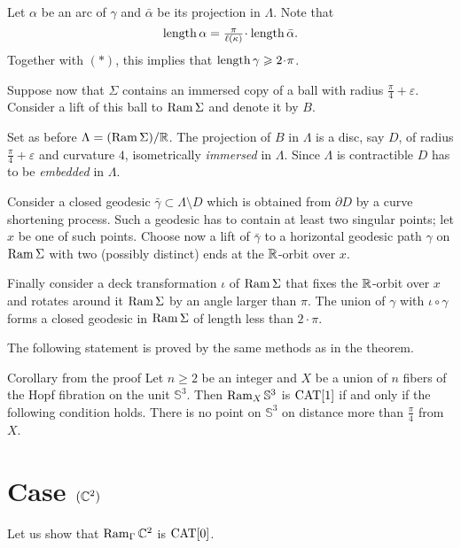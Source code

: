 \documentclass[oneside,a4paper]{article}
\def\Ram{\mathop{\rm Ram}\nolimits}
\def\SS{\mathbb{S}}
\begin{document}
Let $\alpha$ be an arc of $\gamma$
and $\bar\alpha$ be its projection in $\Lambda$.
Note that
$$\length \alpha
=
\tfrac{\pi}{\ell(\kappa)}\cdot\length \bar\alpha.
$$
Together with $({*})$,
this implies that $\length\gamma\ge 2{\cdot}\pi$.

Suppose now that $\Sigma$ contains an immersed copy
of a ball with radius $\frac{\pi}{4}+\varepsilon$.
Consider a lift of this ball to $\Ram \Sigma$ and denote it by $B$.

Set as before $\Lambda=(\Ram \Sigma)/\RR$.
The projection of $B$ in $\Lambda$ is a
disc, say $D$,
of radius $\frac{\pi}{4}+\varepsilon$ and curvature $4$, isometrically
{\it immersed} in $\Lambda$. Since $\Lambda$ is contractible $D$
has to be {\it embedded} in $\Lambda$.

Consider a closed geodesic
$\bar \gamma\subset  \Lambda\setminus D$ which is obtained from $\partial D$ by a curve shortening process.
Such a geodesic has to contain at least two singular points;
let $x$ be one of such points.
Choose now a lift  of $\bar\gamma$ to a horizontal geodesic path $\gamma$
on  $\Ram \Sigma$ with two (possibly distinct) ends at the $\mathbb{R}$-orbit over $x$.

Finally consider a deck transformation
$\iota$ of $\Ram \Sigma$ that fixes  the $\mathbb{R}$-orbit over $x$
and rotates around it $\Ram \Sigma$ by an angle larger than $\pi$.
The union of $\gamma$ with $\iota\circ\gamma$ forms a closed geodesic in
$\Ram \Sigma$ of length less than $2{\cdot}\pi$.
\qeds

The following statement is proved by the same methods as in the theorem.

\begin{thm}{Corollary from the proof}\label{linesinC2} Let $n\ge 2$ be an integer
and $X$ be a union of $n$ fibers
 of the Hopf fibration on  the unit $\SS^3$.
Then $\Ram_{X}\SS^3$ is $\mathrm{CAT}[1]$ if and only if the following condition holds.
There is no point on $\SS^3$ on distance more than $\frac{\pi}{4}$ from $X$.
\end{thm}





\section{Case $(\mathbb{C}^2)$} \label{pkspaces}

Let us show that $\Ram_{\Gamma}\CC^2$ is $\mathrm{CAT}[0]$.
\end{document}
